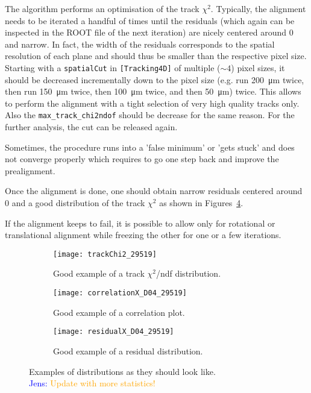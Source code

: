 The algorithm performs an optimisation of the track $\chi^2$.
Typically, the alignment needs to be iterated a handful of times until the residuals (which again can be inspected in the ROOT file of the next iteration) are nicely centered around 0 and narrow.
In fact, the width of the residuals corresponds to the spatial resolution of each plane and should thus be smaller than the respective pixel size.
Starting with a \texttt{spatialCut} in \texttt{[Tracking4D]} of multiple ($\sim4$) pixel sizes, it should be decreased incrementally down to the pixel size (e.g. run \SI{200}{\micro\m} twice, then run \SI{150}{\micro\m} twice, then \SI{100}{\micro\m} twice, and then \SI{50}{\micro\m}) twice.
This allows to perform the alignment with a tight selection of very high quality tracks only.
Also the \texttt{max\_track\_chi2ndof} should be decrease for the same reason.
For the further analysis, the cut can be released again.

Sometimes, the procedure runs into a 'false minimum' or 'gets stuck' and does not converge properly which requires to go one step back and improve the prealignment.

Once the alignment is done, one should obtain narrow residuals centered around 0 and a good distribution of the track $\chi^2$ as shown in Figures~\ref{fig:exampleAlignment}.

If the alignment keeps to fail, it is possible to allow only for rotational or translational alignment while freezing the other for one or a few iterations.

\begin{figure}
    \centering
    \begin{subfigure}[t]{0.66\textwidth}
        \texttt{[image: trackChi2\_29519]}
        \caption{Good example of a track $\chi^2$/ndf distribution.}
        \label{fig:trackChi2}
    \end{subfigure}
    \begin{subfigure}[t]{0.66\textwidth}
        \texttt{[image: correlationX\_D04\_29519]}
        \caption{Good example of a correlation plot.}
        \label{fig:correlationX}
    \end{subfigure}
    \begin{subfigure}[t]{0.66\textwidth}
        \texttt{[image: residualX\_D04\_29519]}
        \caption{Good example of a residual distribution.}
        \label{fig:residualX}
    \end{subfigure}
    \caption{Examples of distributions as they should look like. \\ \textcolor{blue}{Jens: }\textcolor{orange}{Update with more statistics!}}
    \label{fig:exampleAlignment}
\end{figure}

